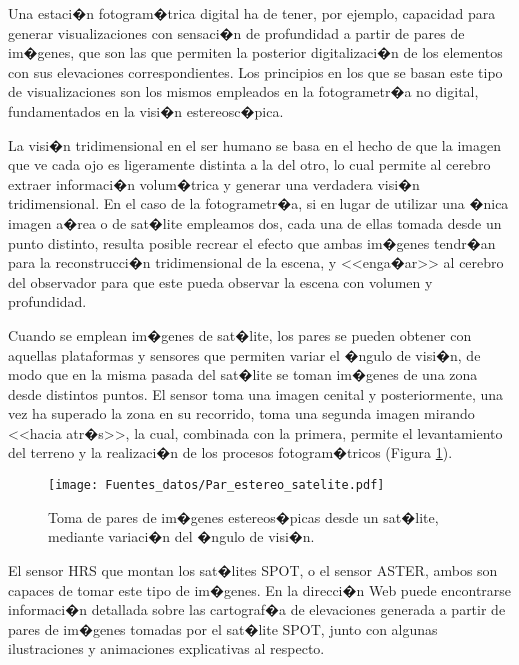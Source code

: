 Una estaci�n fotogram�trica digital ha de tener, por ejemplo, capacidad para generar visualizaciones con sensaci�n de profundidad a partir de pares de im�genes, que son las que permiten la posterior digitalizaci�n de los elementos con sus elevaciones correspondientes. Los principios en los que se basan este tipo de visualizaciones son los mismos empleados en la fotogrametr�a no digital, fundamentados en la visi�n estereosc�pica. 

La visi�n tridimensional en el ser humano se basa en el hecho de que la imagen que ve cada ojo es ligeramente distinta a la del otro, lo cual permite al cerebro extraer informaci�n volum�trica y generar una verdadera visi�n tridimensional. En el caso de la fotogrametr�a, si en lugar de utilizar una �nica imagen a�rea o de sat�lite empleamos dos, cada una de ellas tomada desde un punto distinto, resulta posible recrear el efecto que ambas im�genes tendr�an para la reconstrucci�n tridimensional de la escena, y <<enga�ar>> al cerebro del observador para que este pueda observar la escena con volumen y profundidad.

Cuando se emplean im�genes de sat�lite, los pares se pueden obtener con aquellas plataformas y sensores que permiten variar el �ngulo de visi�n, de modo que en la misma pasada del sat�lite se toman im�genes de una zona desde distintos puntos. El sensor toma una imagen cenital y posteriormente, una vez ha superado la zona en su recorrido, toma una segunda imagen mirando <<hacia atr�s>>, la cual, combinada con la primera, permite el levantamiento del terreno y la realizaci�n de los procesos fotogram�tricos (Figura \ref{Fig:Par_estereo_satelite}).

\begin{figure}[!hbt]
\centering
\texttt{[image: Fuentes\_datos/Par\_estereo\_satelite.pdf]}
\caption{\small Toma de pares de im�genes estereos�picas desde un sat�lite, mediante variaci�n del �ngulo de visi�n.}
\label{Fig:Par_estereo_satelite} 
\end{figure}

El sensor HRS que montan los sat�lites SPOT, o el sensor ASTER, ambos son capaces de tomar este tipo de im�genes. En la direcci�n Web \cite{webSPOTDEM} puede encontrarse informaci�n detallada sobre las cartograf�a de elevaciones generada a partir de pares de im�genes tomadas por el sat�lite SPOT, junto con algunas ilustraciones y animaciones explicativas al respecto. 

